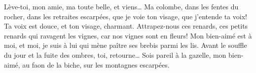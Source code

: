 Lève-toi, mon amie, ma toute belle, et viens…
	Ma colombe, dans les fentes du rocher, dans les retraites escarpées,
	que je voie ton visage, que j’entende ta voix!
	Ta voix est douce, et ton visage, charmant.
Attrapez-nous ces renards, ces petits renards qui ravagent les vignes,
	car nos vignes sont en fleurs!
Mon bien-aimé est à moi, et moi, je suis à lui
	qui mène paître ses brebis parmi les lis.
Avant le souffle du jour et la fuite des ombres, toi, retourne…
	Sois pareil à la gazelle, mon bien-aimé,
	au faon de la biche, sur les montagnes escarpées.
